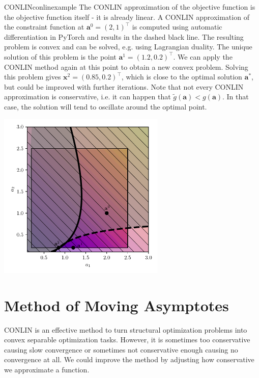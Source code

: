 \begin{example}{CONLIN}{conlinexample}
    The CONLIN approximation of the objective function is the objective function itself - it is already linear. A CONLIN approximation of the constraint function at $\mathbf{a}^0=(2,1)^\top$ is computed using automatic differentiation in PyTorch and results in the dashed black line. The resulting problem is convex and can be solved, e.g. using Lagrangian duality. The unique solution of this problem is the point $\mathbf{a}^1=(1.2,0.2)^\top$. We can apply the CONLIN method again at this point to obtain a new convex problem. Solving this problem gives $\mathbf{x}^2=(0.85,0.2)^\top$, which is close to the optimal solution $\mathbf{a}^*$, but could be improved with further iterations. Note that not every CONLIN approximation is conservative, i.e. it can happen that $\tilde{g}(\mathbf{a}) < g(\mathbf{a})$. In that case, the solution will tend to oscillate around the optimal point. 
    \begin{center}
        \includegraphics[width=0.6\textwidth]{figures/four_bar_example_1.pdf}
    \end{center}
\end{example}

\section{Method of Moving Asymptotes}
CONLIN is an effective method to turn structural optimization problems into convex separable optimization tasks. However, it is sometimes too conservative causing slow convergence or sometimes not conservative enough causing no convergence at all. We could improve the method by adjusting how conservative we approximate a function.

